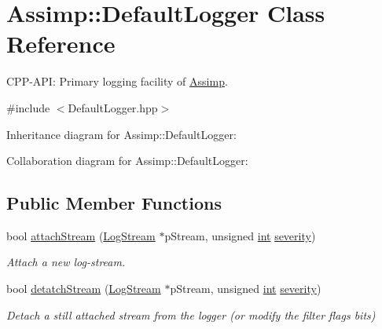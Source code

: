 \hypertarget{class_assimp_1_1_default_logger}{\section{Assimp\-:\-:Default\-Logger Class Reference}
\label{class_assimp_1_1_default_logger}
}


C\-P\-P-\/\-A\-P\-I\-: Primary logging facility of \hyperlink{namespace_assimp}{Assimp}.  




{\ttfamily \#include $<$Default\-Logger.\-hpp$>$}



Inheritance diagram for Assimp\-:\-:Default\-Logger\-:


Collaboration diagram for Assimp\-:\-:Default\-Logger\-:
\subsection*{Public Member Functions}
\begin{DoxyCompactItemize}
\item 
bool \hyperlink{class_assimp_1_1_default_logger_abc0ca7a337f8c3e38eca0eb45bb1ccf0}{attach\-Stream} (\hyperlink{class_assimp_1_1_log_stream}{Log\-Stream} $\ast$p\-Stream, unsigned \hyperlink{_s_d_l__thread_8h_a6a64f9be4433e4de6e2f2f548cf3c08e}{int} \hyperlink{_g_l_e_w_2glew_8h_aa9ef9fc6186ec914a859436da4764bca}{severity})
\begin{DoxyCompactList}\small\item\em Attach a new log-\/stream. \end{DoxyCompactList}\item 
bool \hyperlink{class_assimp_1_1_default_logger_a2615f1d1624f1d742d0cf2dd4a5cccc8}{detatch\-Stream} (\hyperlink{class_assimp_1_1_log_stream}{Log\-Stream} $\ast$p\-Stream, unsigned \hyperlink{_s_d_l__thread_8h_a6a64f9be4433e4de6e2f2f548cf3c08e}{int} \hyperlink{_g_l_e_w_2glew_8h_aa9ef9fc6186ec914a859436da4764bca}{severity})
\begin{DoxyCompactList}\small\item\em Detach a still attached stream from the logger (or modify the filter flags bits) \end{DoxyCompactList}\end{DoxyCompactItemize}
